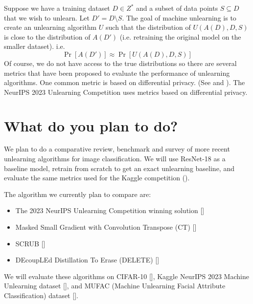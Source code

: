 \documentclass[12pt]{article}
\begin{document}
Suppose we have a training dataset $D \in Z^*$ and a subset of data points $S \subseteq D$ that we wish to unlearn. Let $D' = D \setminus S$. The goal of machine unlearning is to create an unlearning algorithm $U$ such that the distribution of $U(A(D), D, S)$ is close to the distribution of $A(D')$ (i.e. retraining the original model on the smaller dataset).
i.e.
\begin{equation}
    \Pr[A(D')] \approx \Pr[U(A(D), D, S)]
\end{equation} 
Of course, we do not have access to the true distributions so there are several metrics that have been proposed to evaluate the performance of unlearning algorithms. One common metric is based on differential privacy. (See \cite{dwork2014algorithmic} and \cite{sekhari2021remember}). The NeurIPS 2023 Unlearning Competition uses metrics based on differential privacy. \\

\section{What do you plan to do?}
We plan to do a comparative review, benchmark and survey of more recent unlearning algorithms for image classification. We will use ResNet-18 as a baseline model, retrain from scratch to get an exact unlearning baseline, and evaluate the same metrics used for the Kaggle competition (\cite{neurips-2023-machine-unlearning}).

The algorithm we currently plan to compare are:
\begin{itemize}
    \item The 2023 NeurIPS Unlearning Competition winning solution [\cite{2023-winner}]
    \item Masked Small Gradient with Convolution Transpose (CT) [\cite{cadet2025}]
    \item SCRUB [\cite{kurmanji2023unboundedmachineunlearning}]
    \item DEcoupLEd Distillation To Erase (DELETE) [\cite{zhou2025decoupleddistillationerasegeneral}]
\end{itemize}

We will evaluate these algorithms on CIFAR-10 [\cite{Krizhevsky09learningmultiple}], Kaggle NeurIPS 2023 Machine Unlearning dataset [\cite{neurips-2023-machine-unlearning}], and MUFAC (Machine Unlearning Facial Attribute Classification) dataset [\cite{choi2023machine}]. 
\end{document}
